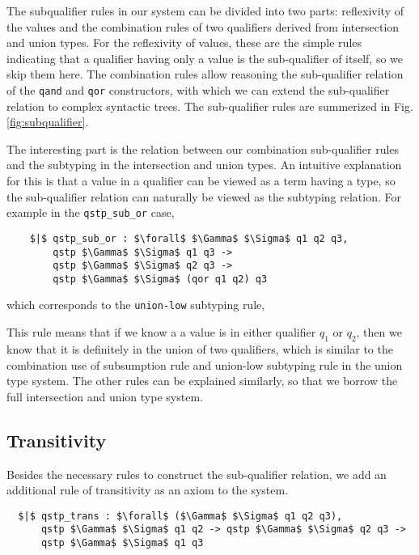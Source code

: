 % 

The subqualifier rules in our system can be divided into two parts: reflexivity of the values and the combination rules of two qualifiers derived from intersection and union types. For the reflexivity of values, these are the simple rules indicating that a qualifier having only a value is the sub-qualifier of itself, so we skip them here. The combination rules allow reasoning the sub-qualifier relation of the \texttt{qand} and \texttt{qor} constructors, with which we can extend the sub-qualifier relation to complex syntactic trees. The sub-qualifier rules are summerized in Fig. \ref{fig:subqualifier}.


The interesting part is the relation between our combination sub-qualifier rules and the subtyping in the intersection and union types. An intuitive explanation for this is that a value in a qualifier can be viewed as a term having a type, so the sub-qualifier relation can naturally be viewed as the subtyping relation. For example in the \texttt{qstp\_sub\_or} case,
\begin{lstlisting}
    $|$ qstp_sub_or : $\forall$ $\Gamma$ $\Sigma$ q1 q2 q3,
        qstp $\Gamma$ $\Sigma$ q1 q3 ->
        qstp $\Gamma$ $\Sigma$ q2 q3 ->
        qstp $\Gamma$ $\Sigma$ (qor q1 q2) q3
\end{lstlisting}
which corresponds to the \texttt{union-low} subtyping rule, 
\begin{mathpar}
\end{mathpar}
This rule means that if we know a a value is in either qualifier \texttt{$q_1$} or \texttt{$q_2$}, then we know that it is definitely in the union of two qualifiers, which is similar to the combination use of subsumption rule and union-low subtyping rule in the union type system. The other rules can be explained similarly, so that we borrow the full intersection and union type system.

\subsection{Transitivity}

Besides the necessary rules to construct the sub-qualifier relation, we add an additional rule of transitivity as an axiom to the system. 
\begin{lstlisting}
  $|$ qstp_trans : $\forall$ ($\Gamma$ $\Sigma$ q1 q2 q3), 
      qstp $\Gamma$ $\Sigma$ q1 q2 -> qstp $\Gamma$ $\Sigma$ q2 q3 ->
      qstp $\Gamma$ $\Sigma$ q1 q3
\end{lstlisting}

